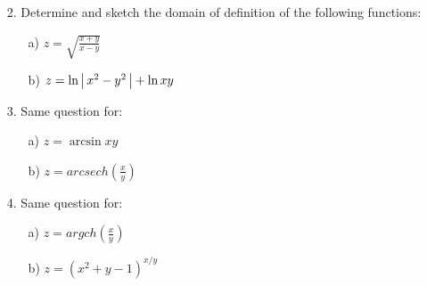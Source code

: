 \documentclass[11pt]{amsbook}
\begin{document}

\begin{enumerate}
        \begin{multicols}{2}
            \begin{enumerate}
                \item [a)] $ f(x,y) = \ln{x^{2}+y^{2}}     $  %
                \item [c)] $ x^{2} + y^{2} + 10z = 0       $
                \item [b)] $ x^{2} + y^{2} + z^{2} = 0     $
                \item [d)] $ \sin{xy} = z^2                $
            \end{enumerate}
        \end{multicols}

    \item[2.] Determine and sketch the domain of definition of the following functions:
    
        \begin{multicols}{2}
            \begin{enumerate}
                \item [a)] $ z = \sqrt{\frac{x+y}{x-y}}     $  %
                \item [b)] $ z = \ln{\ensuremath{\left \lvert \, x^{2} - y^{2} \, \right \rvert} } + \ln{xy}     $
            \end{enumerate}
        \end{multicols}
        
    \item[3.] Same question for:
    
        \begin{multicols}{2}
            \begin{enumerate}
                \item [a)] $ z = \arcsin{xy}     $
                \item [b)] $ z = arcsech(\frac{x}{y})    $ %
            \end{enumerate}
        \end{multicols}
                
    \item[4.] Same question for:
    
        \begin{multicols}{2}
            \begin{enumerate}
                \item [a)] $ z = argch(\frac{x}{y})    $  %
                \item [b)] $ z = (x^{2}+y-1)^{x/y}      $
            \end{enumerate}
        \end{multicols}
            

\end{enumerate}
\end{document}

